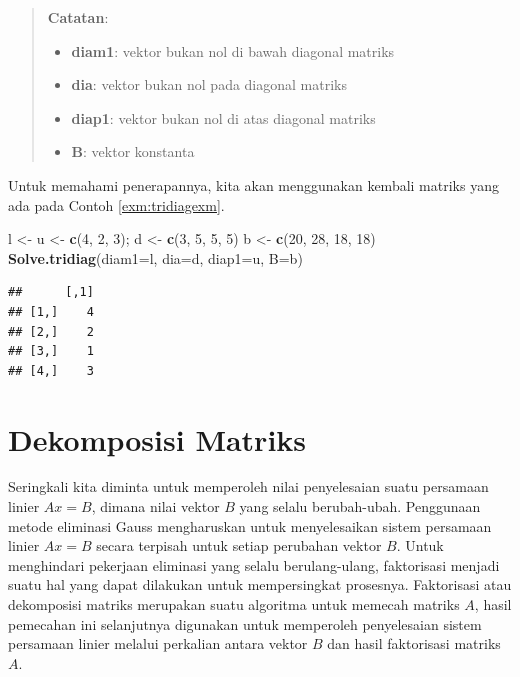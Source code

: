 \documentclass[
]{book}
\newenvironment{Shaded}{\begin{snugshade}}{\end{snugshade}}
\newcommand{\AttributeTok}[1]{\textcolor[rgb]{0.13,0.29,0.53}{#1}}
\newcommand{\DecValTok}[1]{\textcolor[rgb]{0.00,0.00,0.81}{#1}}
\newcommand{\FunctionTok}[1]{\textcolor[rgb]{0.13,0.29,0.53}{\textbf{#1}}}
\newcommand{\NormalTok}[1]{#1}
\newcommand{\OtherTok}[1]{\textcolor[rgb]{0.56,0.35,0.01}{#1}}
\providecommand{\tightlist}{%
  \setlength{\itemsep}{0pt}\setlength{\parskip}{0pt}}
\theoremstyle{definition}
\theoremstyle{definition}
\theoremstyle{definition}
\theoremstyle{definition}
\theoremstyle{remark}
\begin{document}
\begin{quote}
\textbf{Catatan}:

\begin{itemize}
\tightlist
\item
  \textbf{diam1}: vektor bukan nol di bawah diagonal matriks
\item
  \textbf{dia}: vektor bukan nol pada diagonal matriks
\item
  \textbf{diap1}: vektor bukan nol di atas diagonal matriks
\item
  \textbf{B}: vektor konstanta
\end{itemize}
\end{quote}

Untuk memahami penerapannya, kita akan menggunakan kembali matriks yang ada pada Contoh \ref{exm:tridiagexm}.

\begin{Shaded}
\begin{Highlighting}[]
\NormalTok{l }\OtherTok{\textless{}{-}}\NormalTok{ u }\OtherTok{\textless{}{-}} \FunctionTok{c}\NormalTok{(}\DecValTok{4}\NormalTok{, }\DecValTok{2}\NormalTok{, }\DecValTok{3}\NormalTok{); d }\OtherTok{\textless{}{-}} \FunctionTok{c}\NormalTok{(}\DecValTok{3}\NormalTok{, }\DecValTok{5}\NormalTok{, }\DecValTok{5}\NormalTok{, }\DecValTok{5}\NormalTok{)}
\NormalTok{b }\OtherTok{\textless{}{-}} \FunctionTok{c}\NormalTok{(}\DecValTok{20}\NormalTok{, }\DecValTok{28}\NormalTok{, }\DecValTok{18}\NormalTok{, }\DecValTok{18}\NormalTok{)}
\FunctionTok{Solve.tridiag}\NormalTok{(}\AttributeTok{diam1=}\NormalTok{l, }\AttributeTok{dia=}\NormalTok{d, }\AttributeTok{diap1=}\NormalTok{u, }\AttributeTok{B=}\NormalTok{b)}
\end{Highlighting}
\end{Shaded}

\begin{verbatim}
##      [,1]
## [1,]    4
## [2,]    2
## [3,]    1
## [4,]    3
\end{verbatim}

\hypertarget{dekomposisimatriks}{%
\section{Dekomposisi Matriks}\label{dekomposisimatriks}}

Seringkali kita diminta untuk memperoleh nilai penyelesaian suatu persamaan linier \(Ax=B\), dimana nilai vektor \(B\) yang selalu berubah-ubah. Penggunaan metode eliminasi Gauss mengharuskan untuk menyelesaikan sistem persamaan linier \(Ax=B\) secara terpisah untuk setiap perubahan vektor \(B\). Untuk menghindari pekerjaan eliminasi yang selalu berulang-ulang, faktorisasi menjadi suatu hal yang dapat dilakukan untuk mempersingkat prosesnya. Faktorisasi atau dekomposisi matriks merupakan suatu algoritma untuk memecah matriks \(A\), hasil pemecahan ini selanjutnya digunakan untuk memperoleh penyelesaian sistem persamaan linier melalui perkalian antara vektor \(B\) dan hasil faktorisasi matriks \(A\).
\end{document}
